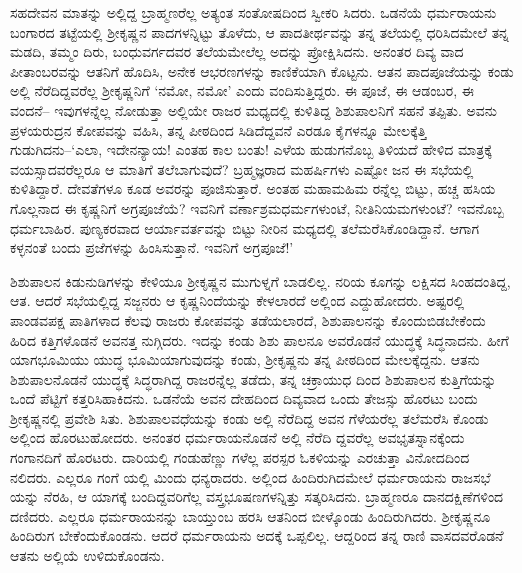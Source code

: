 ಸಹದೇವನ ಮಾತನ್ನು ಅಲ್ಲಿದ್ದ ಬ್ರಾಹ್ಮಣರೆಲ್ಲ ಅತ್ಯಂತ ಸಂತೋಷದಿಂದ ಸ್ವೀಕರಿ ಸಿದರು. ಒಡನೆಯೆ ಧರ್ಮರಾಯನು ಬಂಗಾರದ ತಟ್ಟೆಯಲ್ಲಿ ಶ್ರೀಕೃಷ್ಣನ ಪಾದಗಳನ್ನಿಟ್ಟು ತೊಳೆದು, ಆ ಪಾದತೀರ್ಥವನ್ನು ತನ್ನ ತಲೆಯಲ್ಲಿ ಧರಿಸಿದಮೇಲೆ ತನ್ನ ಮಡದಿ, ತಮ್ಮಂ ದಿರು, ಬಂಧುವರ್ಗದವರ ತಲೆಯಮೇಲೆಲ್ಲ ಅದನ್ನು ಪ್ರೋಕ್ಷಿಸಿದನು. ಅನಂತರ ದಿವ್ಯ ವಾದ ಪೀತಾಂಬರವನ್ನು ಆತನಿಗೆ ಹೊದಿಸಿ, ಅನೇಕ ಆಭರಣಗಳನ್ನು ಕಾಣಿಕೆಯಾಗಿ ಕೊಟ್ಟನು. ಆತನ ಪಾದಪೂಜೆಯನ್ನು ಕಂಡು ಅಲ್ಲಿ ನೆರೆದಿದ್ದವರೆಲ್ಲ ಶ್ರೀಕೃಷ್ಣನಿಗೆ ‘ನಮೋ, ನಮೋ’ ಎಂದು ವಂದಿಸುತ್ತಿದ್ದರು. ಈ ಪೂಜೆ, ಈ ಆಡಂಬರ, ಈ ವಂದನೆ– ಇವುಗಳನ್ನೆಲ್ಲ ನೋಡುತ್ತಾ ಅಲ್ಲಿಯೇ ರಾಜರ ಮಧ್ಯದಲ್ಲಿ ಕುಳಿತಿದ್ದ ಶಿಶುಪಾಲನಿಗೆ ಸಹನೆ ತಪ್ಪಿತು. ಅವನು ಪ್ರಳಯರುದ್ರನ ಕೋಪವನ್ನು ವಹಿಸಿ, ತನ್ನ ಪೀಠದಿಂದ ಸಿಡಿದೆದ್ದವನೆ ಎರಡೂ ಕೈಗಳನ್ನೂ ಮೇಲಕ್ಕೆತ್ತಿ ಗುಡುಗಿದನು–‘ಎಲಾ, ಇದೇನನ್ಯಾಯ! ಎಂತಹ ಕಾಲ ಬಂತು! ಎಳೆಯ ಹುಡುಗನೊಬ್ಬ ತಿಳಿಯದೆ ಹೇಳಿದ ಮಾತ್ರಕ್ಕೆ ವಯಸ್ಸಾದವರೆಲ್ಲರೂ ಆ ಮಾತಿಗೆ ತಲೆಬಾಗುವುದೆ? ಬ್ರಹ್ಮಜ್ಞರಾದ ಮಹರ್ಷಿಗಳು ಎಷ್ಟೋ ಜನ ಈ ಸಭೆಯಲ್ಲಿ ಕುಳಿತಿದ್ದಾರೆ. ದೇವತೆಗಳೂ ಕೂಡ ಅವರನ್ನು ಪೂಜಿಸುತ್ತಾರೆ. ಅಂತಹ ಮಹಾಮಹಿಮ ರನ್ನೆಲ್ಲ ಬಿಟ್ಟು, ಹಚ್ಚ ಹಸಿಯ ಗೊಲ್ಲನಾದ ಈ ಕೃಷ್ಣನಿಗೆ ಅಗ್ರಪೂಜೆಯೆ? ಇವನಿಗೆ ವರ್ಣಾಶ್ರಮಧರ್ಮಗಳುಂಟೆ, ನೀತಿನಿಯಮಗಳುಂಟೆ? ಇವನೊಬ್ಬ ಧರ್ಮಬಾಹಿರ. ಪುಣ್ಯಕರವಾದ ಆರ್ಯಾವರ್ತವನ್ನು ಬಿಟ್ಟು ನೀರಿನ ಮಧ್ಯದಲ್ಲಿ ತಲೆಮರೆಸಿಕೊಂಡಿದ್ದಾನೆ. ಆಗಾಗ ಕಳ್ಳನಂತೆ ಬಂದು ಪ್ರಜೆಗಳನ್ನು ಹಿಂಸಿಸುತ್ತಾನೆ. ಇವನಿಗೆ ಅಗ್ರಪೂಜೆ!’

ಶಿಶುಪಾಲನ ಕಿಡುನುಡಿಗಳನ್ನು ಕೇಳಿಯೂ ಶ್ರೀಕೃಷ್ಣನ ಮುಗುಳ್ನಗೆ ಬಾಡಲಿಲ್ಲ. ನರಿಯ ಕೂಗನ್ನು ಲಕ್ಷಿಸದ ಸಿಂಹದಂತಿದ್ದ, ಆತ. ಆದರೆ ಸಭೆಯಲ್ಲಿದ್ದ ಸಜ್ಜನರು ಆ ಕೃಷ್ಣನಿಂದೆಯನ್ನು ಕೇಳಲಾರದೆ ಅಲ್ಲಿಂದ ಎದ್ದುಹೋದರು. ಅಷ್ಟರಲ್ಲಿ ಪಾಂಡವಪಕ್ಷ ಪಾತಿಗಳಾದ ಕೆಲವು ರಾಜರು ಕೋಪವನ್ನು ತಡೆಯಲಾರದೆ, ಶಿಶುಪಾಲನನ್ನು ಕೊಂದುಬಿಡಬೇಕೆಂದು ಹಿರಿದ ಕತ್ತಿಗಳೊಡನೆ ಅವನತ್ತ ನುಗ್ಗಿದರು. ಇದನ್ನು ಕಂಡು ಶಿಶು ಪಾಲನೂ ಅವರೊಡನೆ ಯುದ್ಧಕ್ಕೆ ಸಿದ್ಧನಾದನು. ಹೀಗೆ ಯಾಗಭೂಮಿಯು ಯುದ್ಧ ಭೂಮಿಯಾಗುವುದನ್ನು ಕಂಡು, ಶ್ರೀಕೃಷ್ಣನು ತನ್ನ ಪೀಠದಿಂದ ಮೇಲಕ್ಕೆದ್ದನು. ಆತನು ಶಿಶುಪಾಲನೊಡನೆ ಯುದ್ಧಕ್ಕೆ ಸಿದ್ಧರಾಗಿದ್ದ ರಾಜರನ್ನೆಲ್ಲ ತಡೆದು, ತನ್ನ ಚಕ್ರಾಯುಧ ದಿಂದ ಶಿಶುಪಾಲನ ಕುತ್ತಿಗೆಯನ್ನು ಒಂದೆ ಪೆಟ್ಟಿಗೆ ಕತ್ತರಿಸಿಹಾಕಿದನು. ಒಡನೆಯೆ ಅವನ ದೇಹದಿಂದ ದಿವ್ಯವಾದ ಒಂದು ತೇಜಸ್ಸು ಹೊರಟು ಬಂದು ಶ್ರೀಕೃಷ್ಣನಲ್ಲಿ ಪ್ರವೇಶಿ ಸಿತು. ಶಿಶುಪಾಲವಧೆಯನ್ನು ಕಂಡು ಅಲ್ಲಿ ನೆರೆದಿದ್ದ ಅವನ ಗೆಳೆಯರೆಲ್ಲ ತಲೆಮರೆಸಿ ಕೊಂಡು ಅಲ್ಲಿಂದ ಹೊರಟುಹೋದರು. ಅನಂತರ ಧರ್ಮರಾಯನೊಡನೆ ಅಲ್ಲಿ ನೆರೆದಿ ದ್ದವರೆಲ್ಲ ಅವಭೃತಸ್ನಾನಕ್ಕೆಂದು ಗಂಗಾನದಿಗೆ ಹೊರಟರು. ದಾರಿಯಲ್ಲಿ ಗಂಡುಹೆಣ್ಣು ಗಳೆಲ್ಲ ಪರಸ್ಪರ ಓಕಳಿಯನ್ನು ಎರಚುತ್ತಾ ವಿನೋದದಿಂದ ನಲಿದರು. ಎಲ್ಲರೂ ಗಂಗೆ ಯಲ್ಲಿ ಮಿಂದು ಧನ್ಯರಾದರು. ಅಲ್ಲಿಂದ ಹಿಂದಿರುಗಿದಮೇಲೆ ಧರ್ಮರಾಯನು ರಾಜಸಭೆ ಯನ್ನು ನೆರಹಿ, ಆ ಯಾಗಕ್ಕೆ ಬಂದಿದ್ದವರಿಗೆಲ್ಲ ವಸ್ತ್ರಭೂಷಣಗಳನ್ನಿತ್ತು ಸತ್ಕರಿಸಿದನು. ಬ್ರಾಹ್ಮಣರೂ ದಾನದಕ್ಷಿಣೆಗಳಿಂದ ದಣಿದರು. ಎಲ್ಲರೂ ಧರ್ಮರಾಯನನ್ನು ಬಾಯ್ತುಂಬ ಹರಸಿ ಆತನಿಂದ ಬೀಳ್ಕೊಂಡು ಹಿಂದಿರುಗಿದರು. ಶ್ರೀಕೃಷ್ಣನೂ ಹಿಂದಿರುಗ ಬೇಕೆಂದುಕೊಂಡನು. ಆದರೆ ಧರ್ಮರಾಯನು ಅದಕ್ಕೆ ಒಪ್ಪಲಿಲ್ಲ. ಆದ್ದರಿಂದ ತನ್ನ ರಾಣಿ ವಾಸದವರೊಡನೆ ಆತನು ಅಲ್ಲಿಯೆ ಉಳಿದುಕೊಂಡನು.

